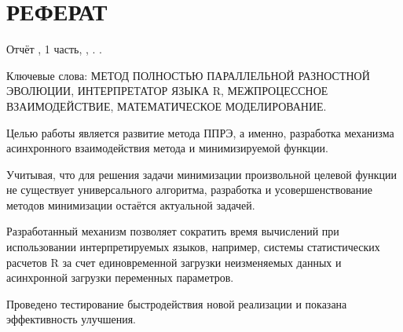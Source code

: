 \chapter*{РЕФЕРАТ}


Отчёт ,
1 часть,
,
.
.
\bigskip

Ключевые слова:
МЕТОД ПОЛНОСТЬЮ ПАРАЛЛЕЛЬНОЙ РАЗНОСТНОЙ ЭВОЛЮЦИИ,
ИНТЕРПРЕТАТОР ЯЗЫКА R,
МЕЖПРОЦЕССНОЕ ВЗАИМОДЕЙСТВИЕ,
МАТЕМАТИЧЕСКОЕ МОДЕЛИРОВАНИЕ.

Целью работы является развитие метода ППРЭ,
а именно, разработка механизма
асинхронного взаимодействия метода
и минимизируемой функции.

Учитывая, что для решения задачи
минимизации произвольной целевой функции
не существует универсального алгоритма,
разработка и усовершенствование
методов минимизации остаётся актуальной задачей.

Разработанный механизм позволяет
сократить время вычислений
при использовании интерпретируемых языков,
например, системы статистических расчетов R
за счет единовременной загрузки
неизменяемых данных и
асинхронной загрузки переменных параметров.

Проведено тестирование быстродействия
новой реализации и показана эффективность улучшения.

